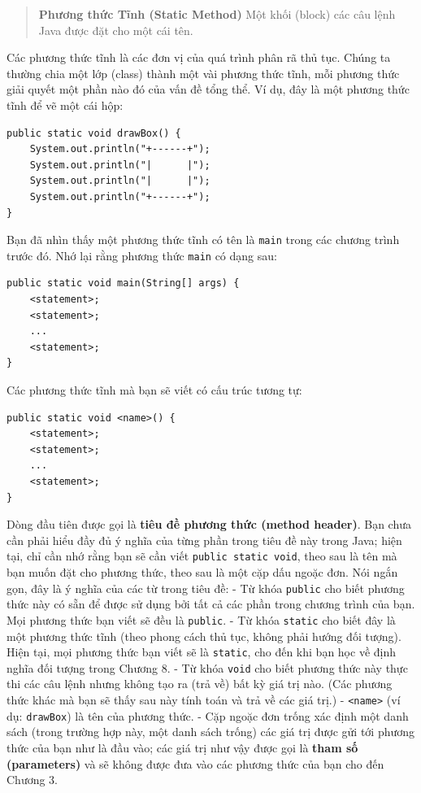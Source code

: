 \begin{quote}
\textbf{Phương thức Tĩnh (Static Method)} Một khối (block) các câu lệnh
Java được đặt cho một cái tên.
\end{quote}

Các phương thức tĩnh là các đơn vị của quá trình phân rã thủ tục. Chúng
ta thường chia một lớp (class) thành một vài phương thức tĩnh, mỗi
phương thức giải quyết một phần nào đó của vấn đề tổng thể. Ví dụ, đây
là một phương thức tĩnh để vẽ một cái hộp:

\begin{verbatim}
public static void drawBox() {
    System.out.println("+------+");
    System.out.println("|      |");
    System.out.println("|      |");
    System.out.println("+------+");
}
\end{verbatim}

Bạn đã nhìn thấy một phương thức tĩnh có tên là \texttt{main} trong các
chương trình trước đó. Nhớ lại rằng phương thức \texttt{main} có dạng
sau:

\begin{verbatim}
public static void main(String[] args) {
    <statement>;
    <statement>;
    ...
    <statement>;
}
\end{verbatim}

Các phương thức tĩnh mà bạn sẽ viết có cấu trúc tương tự:

\begin{verbatim}
public static void <name>() {
    <statement>;
    <statement>;
    ...
    <statement>;
}
\end{verbatim}

Dòng đầu tiên được gọi là \textbf{tiêu đề phương thức (method header)}.
Bạn chưa cần phải hiểu đầy đủ ý nghĩa của từng phần trong tiêu đề này
trong Java; hiện tại, chỉ cần nhớ rằng bạn sẽ cần viết
\texttt{public\ static\ void}, theo sau là tên mà bạn muốn đặt cho
phương thức, theo sau là một cặp dấu ngoặc đơn. Nói ngắn gọn, đây là ý
nghĩa của các từ trong tiêu đề: - Từ khóa \texttt{public} cho biết
phương thức này có sẵn để được sử dụng bởi tất cả các phần trong chương
trình của bạn. Mọi phương thức bạn viết sẽ đều là \texttt{public}. - Từ
khóa \texttt{static} cho biết đây là một phương thức tĩnh (theo phong
cách thủ tục, không phải hướng đối tượng). Hiện tại, mọi phương thức bạn
viết sẽ là \texttt{static}, cho đến khi bạn học về định nghĩa đối tượng
trong Chương 8. - Từ khóa \texttt{void} cho biết phương thức này thực
thi các câu lệnh nhưng không tạo ra (trả về) bất kỳ giá trị nào. (Các
phương thức khác mà bạn sẽ thấy sau này tính toán và trả về các giá
trị.) - \texttt{\textless{}name\textgreater{}} (ví dụ: \texttt{drawBox})
là tên của phương thức. - Cặp ngoặc đơn trống xác định một danh sách
(trong trường hợp này, một danh sách trống) các giá trị được gửi tới
phương thức của bạn như là đầu vào; các giá trị như vậy được gọi là
\textbf{tham số (parameters)} và sẽ không được đưa vào các phương thức
của bạn cho đến Chương 3.

